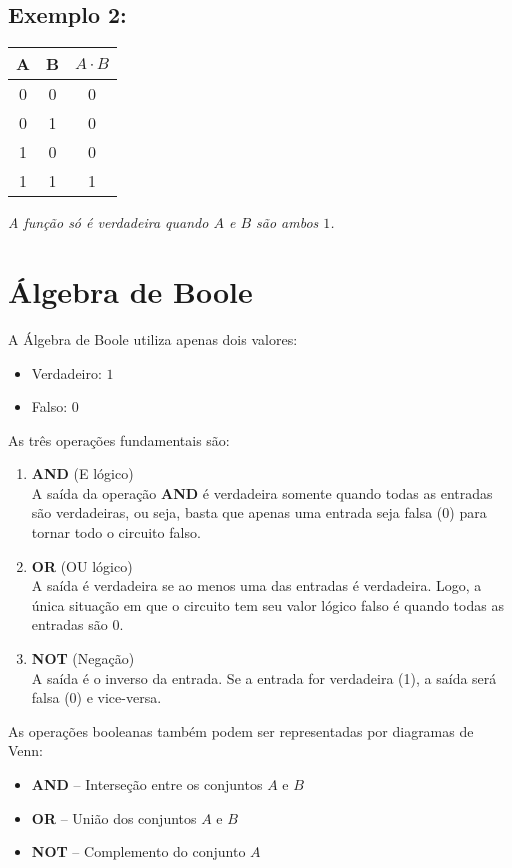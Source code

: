 \documentclass[12pt]{article}
\begin{document}
\subsection*{Exemplo 2:}
\begin{center}
\begin{tabular}{|c|c|c|}
\hline
A & B & \( A \cdot B \) \\
\hline
0 & 0 & 0 \\
0 & 1 & 0 \\
1 & 0 & 0 \\
1 & 1 & 1 \\ 
\hline
\end{tabular}

\vspace{0.5em}
\textit{A função só é verdadeira quando $A$ e $B$ são ambos $1$.}
\end{center}

\section{Álgebra de Boole}

A Álgebra de Boole utiliza apenas dois valores:
\begin{itemize}
   \item Verdadeiro: $1$
   \item Falso: $0$
\end{itemize}

As três operações fundamentais são:

\begin{enumerate}
   \item \textbf{AND} (E lógico) \\
   A saída da operação \textbf{AND} é verdadeira somente quando todas as entradas são verdadeiras, ou seja, basta que apenas uma entrada seja falsa (0) para tornar todo o circuito falso. 
   \item \textbf{OR} (OU lógico) \\
   A saída é verdadeira se ao menos uma das entradas é verdadeira. Logo, a única situação em que o circuito tem seu valor lógico falso é quando todas as entradas são 0.
   \item \textbf{NOT} (Negação) \\
   A saída é o inverso da entrada. Se a entrada for verdadeira (1), a saída será falsa (0) e vice-versa.
\end{enumerate} 

\begin{tcolorbox}[mynote, title= Observação: Relação com Diagrama de Venn]
As operações booleanas também podem ser representadas por diagramas de Venn:
\begin{itemize}
   \item \textbf{AND} – Interseção entre os conjuntos $A$ e $B$
   \item \textbf{OR} – União dos conjuntos $A$ e $B$
   \item \textbf{NOT} – Complemento do conjunto $A$
\end{itemize}
\end{tcolorbox}
\end{document}
